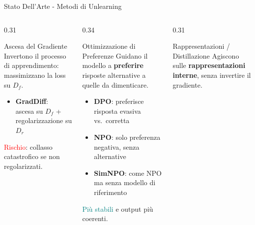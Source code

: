 \documentclass[aspectratio=169,11pt]{beamer}
\begin{document}
\begin{frame}{Stato Dell'Arte - Metodi di Unlearning}
  \begin{columns}[T]
    \begin{column}{0.31\textwidth}
      \begin{block}{\small Ascesa del Gradiente}
        \scriptsize
        Invertono il processo di apprendimento: massimizzano la loss su $D_f$.
        \vspace{0.5em}
        \begin{itemize}\setlength{\itemsep}{4pt}
          \item \textbf{GradDiff}:\\ascesa su $D_f$ + regolarizzazione su $D_r$
        \end{itemize}
        \vspace{0.5em}
        {\tiny \textcolor{red}{Rischio}: collasso catastrofico se non regolarizzati.}
      \end{block}
    \end{column}
    \hfill
    \begin{column}{0.34\textwidth}
      \begin{block}{\small Ottimizzazione di Preferenze}
        \scriptsize
        Guidano il modello a \textbf{preferire} risposte alternative a quelle da dimenticare.
        \vspace{0.5em}
        \begin{itemize}\setlength{\itemsep}{4pt}
          \item \textbf{DPO}: preferisce risposta evasiva vs.\ corretta
          \item \textbf{NPO}: solo preferenza negativa, senza alternative
          \item \textbf{SimNPO}: come NPO ma senza modello di riferimento
        \end{itemize}
        \vspace{0.5em}
        {\tiny \textcolor{teal}{Pi\`u stabili} e output pi\`u coerenti.}
      \end{block}
    \end{column}
    \hfill
    \begin{column}{0.31\textwidth}
      \begin{block}{\small Rappresentazioni / Distillazione}
        \scriptsize
        Agiscono sulle \textbf{rappresentazioni interne}, senza invertire il gradiente.
        \vspace{0.5em}
        \begin{itemize}\setlength{\itemsep}{4pt}

\end{itemize}
\end{block}
\end{column}
\end{columns}
\end{frame}
\end{document}
